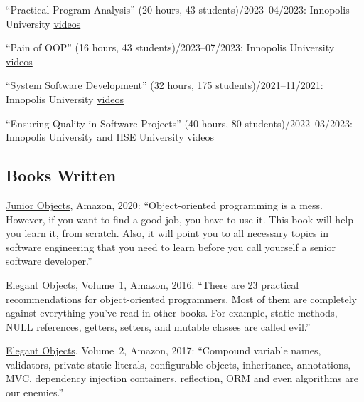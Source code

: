 \documentclass{yb}
\begin{document}
    ``Practical Program Analysis'' (20 hours, 43 students)/2023--04/2023: Innopolis University\newline
    \href{https://www.youtube.com/playlist?list=PLaIsQH4uc08wdXIC4utfgMxV_iswE9_Md}{videos}

    ``Pain of OOP'' (16 hours, 43 students)/2023--07/2023: Innopolis University\newline
    \href{https://www.youtube.com/playlist?list=PLaIsQH4uc08ytf8POIIAkkR4ZsRq8DFiV}{videos}

    ``System Software Development'' (32 hours, 175 students)/2021--11/2021: Innopolis University\newline
    \href{https://www.youtube.com/playlist?list=PLaIsQH4uc08woJKRAA7mmjs9fU0jeKjjM}{videos}

    ``Ensuring Quality in Software Projects'' (40 hours, 80 students)/2022--03/2023: Innopolis University and HSE University\newline
    \href{https://www.youtube.com/playlist?list=PLaIsQH4uc08y14wCJMeffS2yErN4QpB8m}{videos}

    \subsection*{Books Written}

    \href{https://amzn.to/2u9BbqF}{Junior Objects}, Amazon, 2020:
    ``Object-oriented programming is a mess. However,
    if you want to find a good job, you have to use it.
    This book will help you learn it, from scratch.
    Also, it will point you to all necessary topics
    in software engineering that you need to learn before
    you call yourself a senior software developer.''

    \href{https://amzn.to/2E5UHqZ}{Elegant Objects}, Volume~1, Amazon, 2016:
    ``There are 23 practical recommendations for object-oriented programmers. Most of them are completely
    against everything you've read in other books.
    For example, static methods, NULL references, getters, setters, and
    mutable classes are called evil.''

    \href{https://amzn.to/2J2s5T4}{Elegant Objects}, Volume~2, Amazon, 2017:
    ``Compound variable names, validators, private static literals, configurable objects, inheritance,
    annotations, MVC, dependency injection containers, reflection, ORM and even algorithms are our enemies.''
\end{document}
